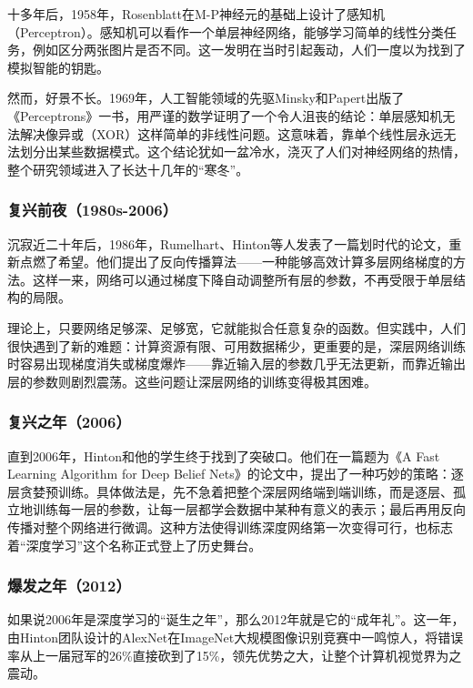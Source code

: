 \documentclass[lang=cn,zihao=-4,a4paper,fontset=windows]{beautybook}
\begin{document}
十多年后，1958年，Rosenblatt在M-P神经元的基础上设计了感知机（Perceptron）。感知机可以看作一个单层神经网络，能够学习简单的线性分类任务，例如区分两张图片是否不同。这一发明在当时引起轰动，人们一度以为找到了模拟智能的钥匙。

然而，好景不长。1969年，人工智能领域的先驱Minsky和Papert出版了《Perceptrons》一书，用严谨的数学证明了一个令人沮丧的结论：单层感知机无法解决像异或（XOR）这样简单的非线性问题。这意味着，靠单个线性层永远无法划分出某些数据模式。这个结论犹如一盆冷水，浇灭了人们对神经网络的热情，整个研究领域进入了长达十几年的“寒冬”。

\subsubsection*{复兴前夜（1980s-2006）}

沉寂近二十年后，1986年，Rumelhart、Hinton等人发表了一篇划时代的论文，重新点燃了希望。他们提出了反向传播算法——一种能够高效计算多层网络梯度的方法。这样一来，网络可以通过梯度下降自动调整所有层的参数，不再受限于单层结构的局限。

理论上，只要网络足够深、足够宽，它就能拟合任意复杂的函数。但实践中，人们很快遇到了新的难题：计算资源有限、可用数据稀少，更重要的是，深层网络训练时容易出现梯度消失或梯度爆炸——靠近输入层的参数几乎无法更新，而靠近输出层的参数则剧烈震荡。这些问题让深层网络的训练变得极其困难。

\subsubsection*{复兴之年（2006）}

直到2006年，Hinton和他的学生终于找到了突破口。他们在一篇题为《A Fast Learning Algorithm for Deep Belief Nets》的论文中，提出了一种巧妙的策略：逐层贪婪预训练。具体做法是，先不急着把整个深层网络端到端训练，而是逐层、孤立地训练每一层的参数，让每一层都学会数据中某种有意义的表示；最后再用反向传播对整个网络进行微调。这种方法使得训练深度网络第一次变得可行，也标志着“深度学习”这个名称正式登上了历史舞台。

\subsubsection*{爆发之年（2012）}

如果说2006年是深度学习的“诞生之年”，那么2012年就是它的“成年礼”。这一年，由Hinton团队设计的AlexNet在ImageNet大规模图像识别竞赛中一鸣惊人，将错误率从上一届冠军的26\%直接砍到了15\%，领先优势之大，让整个计算机视觉界为之震动。
\end{document}
